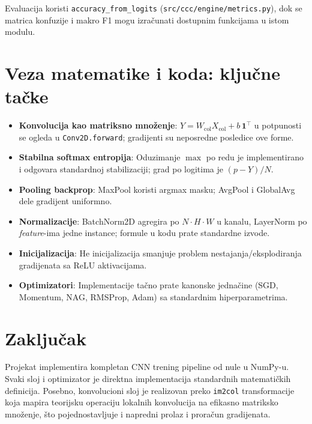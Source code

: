 \documentclass[11pt,a4paper]{article}
\begin{document}
Evaluacija koristi \texttt{accuracy\_from\_logits} (\texttt{src/ccc/engine/metrics.py}), dok se matrica konfuzije i makro F1 mogu izračunati dostupnim funkcijama u istom modulu.

\section{Veza matematike i koda: ključne tačke}
\begin{itemize}
  \item \textbf{Konvolucija kao matriksno množenje}: $Y=W_{\text{col}}X_{\text{col}}+b\,\mathbf{1}^\top$ u potpunosti se ogleda u \texttt{Conv2D.forward}; gradijenti su neposredne posledice ove forme.
  \item \textbf{Stabilna softmax entropija}: Oduzimanje \(\max\) po redu je implementirano i odgovara standardnoj stabilizaciji; grad po logitima je $(p{-}Y)/N$.
  \item \textbf{Pooling backprop}: MaxPool koristi argmax masku; AvgPool i GlobalAvg dele gradijent uniformno.
  \item \textbf{Normalizacije}: BatchNorm2D agregira po $N\cdot H\cdot W$ u kanalu, LayerNorm po \emph{feature}-ima jedne instance; formule u kodu prate standardne izvode.
  \item \textbf{Inicijalizacija}: He inicijalizacija smanjuje problem nestajanja/eksplodiranja gradijenata sa ReLU aktivacijama.
  \item \textbf{Optimizatori}: Implementacije tačno prate kanonske jednačine (SGD, Momentum, NAG, RMSProp, Adam) sa standardnim hiperparametrima.
\end{itemize}

\section{Zaključak}
Projekat implementira kompletan CNN trening pipeline od nule u NumPy-u. Svaki sloj i optimizator je direktna implementacija standardnih matematičkih definicija. Posebno, konvolucioni sloj je realizovan preko \texttt{im2col} transformacije koja mapira teorijsku operaciju lokalnih konvolucija na efikasno matriksko množenje, što pojednostavljuje i napredni prolaz i proračun gradijenata.
\end{document}
